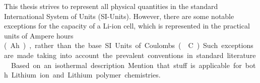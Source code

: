 This  thesis  strives to  represent  all  physical  quantities in  the  standard
International  System  of Units  (SI-Units).  However,  there are  some  notable
exceptions \eg{} for the capacity of a  Li-ion cell, which is represented in the
practical units  of Ampere  hours (\SI{}Ah),  rather than the  base SI  Units of
Coulombs (\SI{}{\coulomb}).  Such exceptions  are made  taking into  account the
prevalent conventions in standard literature.




Based on an isothermal description
Mention  that stuff  is  applicable for  both Lithium  ion  and Lithium  polymer
chemistries.






